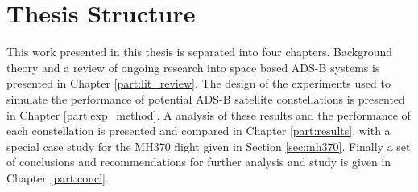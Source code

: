 \section{Thesis Structure}
This work presented in this thesis is separated into four chapters. Background theory and a review of ongoing research into space based ADS-B systems is presented in Chapter \ref{part:lit_review}. The design of the experiments used to simulate the performance of potential ADS-B satellite constellations is presented in Chapter \ref{part:exp_method}. A analysis of these results and the performance of each constellation is presented and compared in Chapter \ref{part:results}, with a special case study for the MH370 flight given in Section \ref{sec:mh370}. Finally a set of conclusions and recommendations for further analysis and study is given in Chapter \ref{part:concl}.